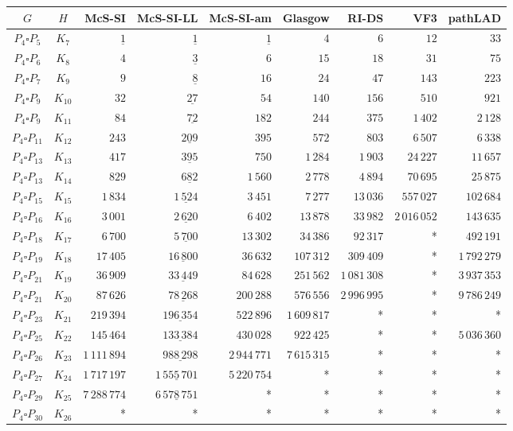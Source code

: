 
\begin{tabular}{ccrrrrrrr}
    \toprule
    {$G$} & {$H$} & {McS-SI} & {McS-SI-LL} & {McS-SI-am} & Glasgow & RI-DS & VF3 & pathLAD \\ 
    \midrule

$P_4\square P_{5}$ & $K_{7}$ & $\underline{1}$ & $\underline{1}$ & $\underline{1}$ & $4$ & $6$ & $12$ & $33$\\
$P_4\square P_{6}$ & $K_{8}$ & $4$ & $\underline{3}$ & $6$ & $15$ & $18$ & $31$ & $75$\\
$P_4\square P_{7}$ & $K_{9}$ & $9$ & $\underline{8}$ & $16$ & $24$ & $47$ & $143$ & $223$\\
$P_4\square P_{9}$ & $K_{10}$ & $32$ & $\underline{27}$ & $54$ & $140$ & $156$ & $510$ & $921$\\
$P_4\square P_{9}$ & $K_{11}$ & $84$ & $\underline{72}$ & $182$ & $244$ & $375$ & $1\,402$ & $2\,128$\\
$P_4\square P_{11}$ & $K_{12}$ & $243$ & $\underline{209}$ & $395$ & $572$ & $803$ & $6\,507$ & $6\,338$\\
$P_4\square P_{13}$ & $K_{13}$ & $417$ & $\underline{395}$ & $750$ & $1\,284$ & $1\,903$ & $24\,227$ & $11\,657$\\
$P_4\square P_{13}$ & $K_{14}$ & $829$ & $\underline{682}$ & $1\,560$ & $2\,778$ & $4\,894$ & $70\,695$ & $25\,875$\\
$P_4\square P_{15}$ & $K_{15}$ & $1\,834$ & $\underline{1\,524}$ & $3\,451$ & $7\,277$ & $13\,036$ & $557\,027$ & $102\,684$\\
$P_4\square P_{16}$ & $K_{16}$ & $3\,001$ & $\underline{2\,620}$ & $6\,402$ & $13\,878$ & $33\,982$ & $2\,016\,052$ & $143\,635$\\
$P_4\square P_{18}$ & $K_{17}$ & $6\,700$ & $\underline{5\,700}$ & $13\,302$ & $34\,386$ & $92\,317$ & * & $492\,191$\\
$P_4\square P_{19}$ & $K_{18}$ & $17\,405$ & $\underline{16\,800}$ & $36\,632$ & $107\,312$ & $309\,409$ & * & $1\,792\,279$\\
$P_4\square P_{21}$ & $K_{19}$ & $36\,909$ & $\underline{33\,449}$ & $84\,628$ & $251\,562$ & $1\,081\,308$ & * & $3\,937\,353$\\
$P_4\square P_{21}$ & $K_{20}$ & $87\,626$ & $\underline{78\,268}$ & $200\,288$ & $576\,556$ & $2\,996\,995$ & * & $9\,786\,249$\\
$P_4\square P_{23}$ & $K_{21}$ & $219\,394$ & $\underline{196\,354}$ & $522\,896$ & $1\,609\,817$ & * & * & *\\
$P_4\square P_{25}$ & $K_{22}$ & $145\,464$ & $\underline{133\,384}$ & $430\,028$ & $922\,425$ & * & * & $5\,036\,360$\\
$P_4\square P_{26}$ & $K_{23}$ & $1\,111\,894$ & $\underline{988\,298}$ & $2\,944\,771$ & $7\,615\,315$ & * & * & *\\
$P_4\square P_{27}$ & $K_{24}$ & $1\,717\,197$ & $\underline{1\,555\,701}$ & $5\,220\,754$ & * & * & * & *\\
$P_4\square P_{29}$ & $K_{25}$ & $7\,288\,774$ & $\underline{6\,578\,751}$ & * & * & * & * & *\\
$P_4\square P_{30}$ & $K_{26}$ & * & * & * & * & * & * & *\\

    \bottomrule
\end{tabular}

